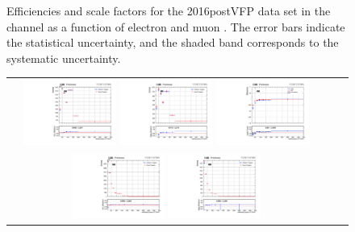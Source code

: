 \begin{figure}[!htb]
\begin{center}
\begin{tabular}{ccc}
    \end{tabular}
    \caption{Efficiencies and scale factors for the 2016postVFP data set in the \emu channel as a function of electron and muon \pT.
            The error bars indicate the statistical uncertainty, and the shaded band corresponds to the systematic uncertainty.
            }
    \label{TrigSF_2016postVFP_1}
  \end{center}
\end{figure}

\begin{figure}[!htb]
  \begin{center}
    \begin{tabular}{ccc}
      \includegraphics[width=0.30\textwidth]{fig_2016postVFP_TrigSF/g_lepApt_ee_MC.pdf}
      \includegraphics[width=0.30\textwidth]{fig_2016postVFP_TrigSF/g_lepApt_ee_data.pdf}
      \includegraphics[width=0.30\textwidth]{fig_2016postVFP_TrigSF/g_ee_lepApt_FullSystUncBand.pdf}\\
      \includegraphics[width=0.30\textwidth]{fig_2016postVFP_TrigSF/g_lepBpt_ee_MC.pdf}
      \includegraphics[width=0.30\textwidth]{fig_2016postVFP_TrigSF/g_lepBpt_ee_data.pdf}

\end{tabular}
\end{center}
\end{figure}
